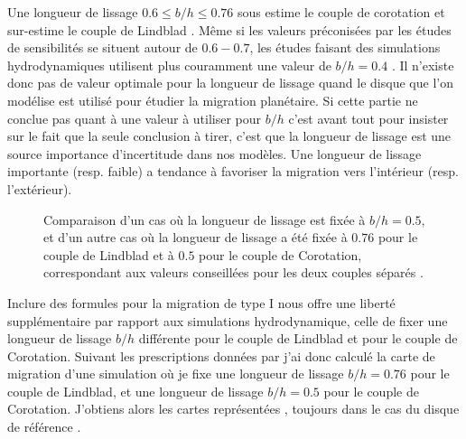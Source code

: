 Une longueur de lissage $0.6 \leqslant b/h \leqslant 0.76$ sous estime le couple de corotation et sur-estime le couple de
Lindblad \citep{masset2002coorbital}. Même si les valeurs préconisées par les études de sensibilités se situent autour de
$0.6-0.7$, les études faisant des simulations hydrodynamiques utilisent plus couramment une valeur de $b/h=0.4$
\citep{paardekooper2011torque}. Il n'existe donc pas de valeur optimale pour la longueur de lissage quand le disque que l'on
modélise est utilisé pour étudier la migration planétaire. Si cette partie ne conclue pas quant à une valeur à utiliser pour
$b/h$ c'est avant tout pour insister sur le fait que la seule conclusion à tirer, c'est que la longueur de lissage est une
source importance d'incertitude dans nos modèles. Une longueur de lissage importante (resp. faible) a tendance à favoriser la
migration vers l'intérieur (resp. l'extérieur). 

\begin{figure}[htbp]
\centering
{}\hfill
{}
\caption{Comparaison d'un cas où la longueur de lissage est fixée à $b/h=0.5$, et d'un autre cas où la longueur de lissage a été
fixée à $0.76$ pour le couple de Lindblad et à $0.5$ pour le couple de Corotation, correspondant aux valeurs conseillées pour
les deux couples séparés \citep{masset2002coorbital}. }\label{fig:modified_smoothing}
\end{figure}

Inclure des formules pour la migration de type I nous offre une liberté supplémentaire par rapport aux simulations
hydrodynamique, celle de fixer une longueur de lissage $b/h$ différente pour le couple de Lindblad et pour le couple de
Corotation. Suivant les prescriptions données par \cite{masset2002coorbital} j'ai donc calculé la carte de migration d'une
simulation où je fixe une longueur de lissage $b/h=0.76$ pour le couple de Lindblad, et une longueur de lissage $b/h=0.5$ pour
le couple de Corotation. J'obtiens alors les cartes représentées , toujours dans le cas du disque
de référence . 

